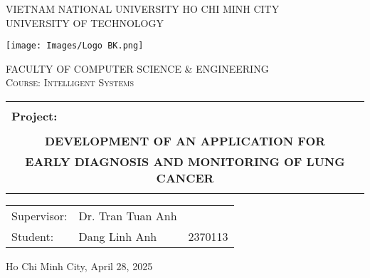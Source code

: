 \documentclass[12pt, a4paper]{article}
\begin{document}
\begin{titlepage}

        
	\centering
	
	{\scshape\large VIETNAM NATIONAL UNIVERSITY HO CHI MINH CITY\\UNIVERSITY OF TECHNOLOGY \par}
	\vspace{0.5cm}
	\texttt{[image: Images/Logo BK.png]}\par\vspace{0.1 cm}
	{\scshape\large FACULTY OF COMPUTER SCIENCE \& ENGINEERING \\
	                Course: Intelligent Systems\par}
	\vspace{1.5cm}

	\begin{center}
	    \color{blue}
	    \begin{tabular}{c}
	    \hline
	    \\
	    \multicolumn{1}{l}{\large \bfseries Project:}\\
	    \\
	    \Large \bfseries DEVELOPMENT OF AN APPLICATION FOR \\
        \Large \bfseries EARLY DIAGNOSIS AND MONITORING OF LUNG CANCER \\
	    \\
	    \hline
	    \end{tabular}
	\end{center}

	\vspace{1cm}
	\begin{center}
	    \large 
	    \begin{tabular}{l l l}
	        Supervisor:   &  Dr. Tran Tuan Anh &\\
	        Student:   &  Dang Linh Anh & 2370113\\
	    \end{tabular}
	    
	\end{center}
    \vspace{1.5cm}
	\vfill
	{ Ho Chi Minh City, April 28, 2025 }
\end{titlepage}
\end{document}
